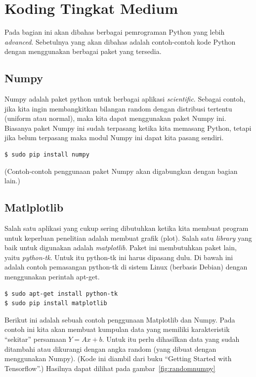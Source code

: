 \chapter{Koding Tingkat Medium}
Pada bagian ini akan dibahas berbagai pemrograman Python yang lebih {\em advanced}. Sebetulnya yang akan dibahas adalah contoh-contoh kode Python dengan menggunakan berbagai paket yang tersedia.

\section{Numpy}
Numpy adalah paket python untuk berbagai aplikasi {\em scientific}. 
Sebagai contoh, jika kita ingin membangkitkan bilangan random dengan 
distribusi tertentu (uniform atau normal), maka kita dapat menggunakan 
paket Numpy ini.
Biasanya paket Numpy ini sudah terpasang ketika kita memasang Python,
tetapi jika belum terpasang maka modul Numpy ini dapat kita pasang sendiri.

\begin{verbatim}
$ sudo pip install numpy
\end{verbatim}

(Contoh-contoh penggunaan paket Numpy akan digabungkan dengan bagian lain.)

\section{Matlplotlib}
Salah satu aplikasi yang cukup sering dibutuhkan ketika kita membuat program 
untuk keperluan penelitian adalah membuat grafik (plot). 
Salah satu {\em library} yang baik untuk digunakan adalah {\em matplotlib}. 
Paket ini membutuhkan paket lain, yaitu {\em python-tk}. 
Untuk itu python-tk ini harus dipasang dulu. 
Di bawah ini adalah contoh pemasangan python-tk di sistem Linux (berbasis Debian) 
dengan menggunakan perintah apt-get.

\begin{verbatim}
$ sudo apt-get install python-tk
$ sudo pip install matplotlib
\end{verbatim}

Berikut ini adalah sebuah contoh penggunaan Matplotlib dan Numpy. Pada contoh ini kita akan membuat kumpulan data yang memiliki karakteristik ``sekitar'' persamaan 
$Y = Ax + b$.
Untuk itu perlu dihasilkan data yang sudah ditambahi atau dikurangi dengan angka random (yang dibuat dengan menggunakan Numpy). (Kode ini diambil dari buku ``Getting Started with Tensorflow''\cite{tensorflowstarted}.)
Hasilnya dapat dilihat pada gambar~\ref{fig:randomnumpy}


